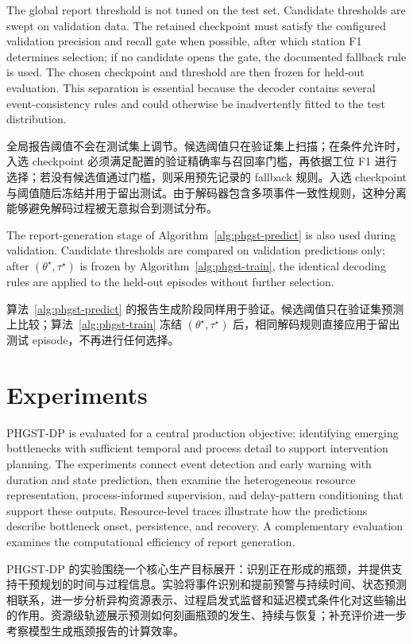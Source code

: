 \documentclass[a4paper,fleqn]{cas-dc}
\newcommand{\zhpara}[1]{%
  \par\begingroup\small\color{black!72}\noindent #1\par\endgroup}
\begin{document}
The global report threshold is not tuned on the test set. Candidate thresholds are swept on validation data. The retained checkpoint must satisfy the configured validation precision and recall gate when possible, after which station F1 determines selection; if no candidate opens the gate, the documented fallback rule is used. The chosen checkpoint and threshold are then frozen for held-out evaluation. This separation is essential because the decoder contains several event-consistency rules and could otherwise be inadvertently fitted to the test distribution.

\zhpara{全局报告阈值不会在测试集上调节。候选阈值只在验证集上扫描；在条件允许时，入选 checkpoint 必须满足配置的验证精确率与召回率门槛，再依据工位 F1 进行选择；若没有候选值通过门槛，则采用预先记录的 fallback 规则。入选 checkpoint 与阈值随后冻结并用于留出测试。由于解码器包含多项事件一致性规则，这种分离能够避免解码过程被无意拟合到测试分布。}

The report-generation stage of Algorithm~\ref{alg:phgst-predict} is also used during validation. Candidate thresholds are compared on validation predictions only; after $(\theta^{\star},\tau^{\star})$ is frozen by Algorithm~\ref{alg:phgst-train}, the identical decoding rules are applied to the held-out episodes without further selection.

\zhpara{算法~\ref{alg:phgst-predict} 的报告生成阶段同样用于验证。候选阈值只在验证集预测上比较；算法~\ref{alg:phgst-train} 冻结 $(\theta^{\star},\tau^{\star})$ 后，相同解码规则直接应用于留出测试 episode，不再进行任何选择。}

\section{Experiments}\label{sec:exp}

PHGST-DP is evaluated for a central production objective: identifying emerging bottlenecks with sufficient temporal and process detail to support intervention planning. The experiments connect event detection and early warning with duration and state prediction, then examine the heterogeneous resource representation, process-informed supervision, and delay-pattern conditioning that support these outputs. Resource-level traces illustrate how the predictions describe bottleneck onset, persistence, and recovery. A complementary evaluation examines the computational efficiency of report generation.

\zhpara{PHGST-DP 的实验围绕一个核心生产目标展开：识别正在形成的瓶颈，并提供支持干预规划的时间与过程信息。实验将事件识别和提前预警与持续时间、状态预测相联系，进一步分析异构资源表示、过程启发式监督和延迟模式条件化对这些输出的作用。资源级轨迹展示预测如何刻画瓶颈的发生、持续与恢复；补充评价进一步考察模型生成瓶颈报告的计算效率。}
\end{document}
